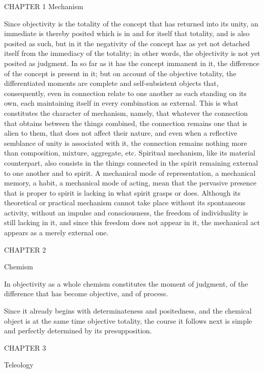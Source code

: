 CHAPTER 1 Mechanism

Since objectivity is the totality of the concept
that has returned into its unity,
an immediate is thereby posited
which is in and for itself that totality,
and is also posited as such,
but in it the negativity of the concept has as yet
not detached itself from the immediacy of the totality;
in other words, the objectivity is not yet posited as judgment.
In so far as it has the concept immanent in it,
the difference of the concept is present in it;
but on account of the objective totality,
the differentiated moments are
complete and self-subsistent objects
that, consequently, even in connection
relate to one another as each standing on its own,
each maintaining itself in every combination as external.
This is what constitutes the character of mechanism,
namely, that whatever the connection that
obtains between the things combined,
the connection remains one that is alien to them,
that does not affect their nature,
and even when a reflective semblance
of unity is associated with it,
the connection remains nothing more than
composition, mixture, aggregate, etc.
Spiritual mechanism, like its material counterpart,
also consists in the things connected in the spirit
remaining external to one another and to spirit.
A mechanical mode of representation,
a mechanical memory, a habit, a mechanical mode of acting,
mean that the pervasive presence that is proper to spirit
is lacking in what spirit grasps or does.
Although its theoretical or practical mechanism
cannot take place without its spontaneous activity,
without an impulse and consciousness,
the freedom of individuality is still lacking in it,
and since this freedom does not appear in it,
the mechanical act appears as a merely external one.

CHAPTER 2

Chemism

In objectivity as a whole
chemism constitutes the moment of judgment,
of the difference that has become objective,
and of process.

Since it already begins with
determinateness and positedness,
and the chemical object is
at the same time objective totality,
the course it follows next is
simple and perfectly determined
by its presupposition.

CHAPTER 3

Teleology

